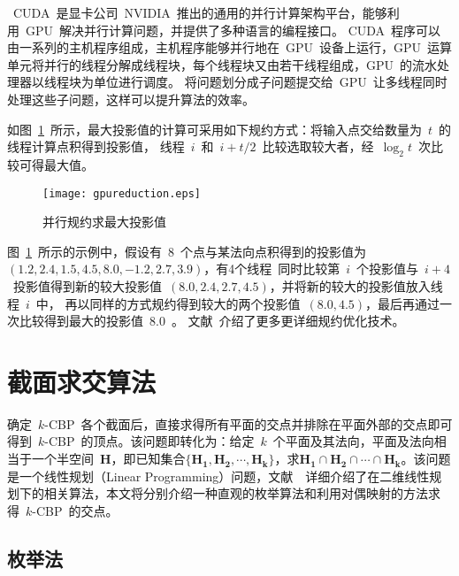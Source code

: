 ~CUDA~是显卡公司~NVIDIA~推出的通用的并行计算架构平台，能够利用~GPU~解决并行计算问题，并提供了多种语言的编程接口。
CUDA~程序可以由一系列的主机程序组成，主机程序能够并行地在~GPU~设备上运行，GPU~运算单元将并行的线程分解成线程块，每个线程块又由若干线程组成，GPU~的流水处理器以线程块为单位进行调度。
将问题划分成子问题提交给~GPU~让多线程同时处理这些子问题，这样可以提升算法的效率\cite{lauterbach2009fast}。

如图~\ref{lbl:reduction-getmax}~所示，最大投影值的计算可采用如下规约方式：将输入点交给数量为~$t$~的线程计算点积得到投影值，
线程~$i$~和~$i+t/2$~比较选取较大者，经~$\log_2t$~次比较可得最大值。

\begin{figure}[htbp] %
\centering
\texttt{[image: gpureduction.eps]}
\caption{并行规约求最大投影值}
\label{lbl:reduction-getmax}
\end{figure}

图~\ref{lbl:reduction-getmax}~所示的示例中，假设有~8~个点与某法向点积得到的投影值为~$(1.2,2.4,1.5,4.5,8.0,-1.2,2.7,3.9)$，有4个线程~同时比较第~$i$~个投影值与~$i+4$~投影值得到新的较大投影值~$(8.0,2.4,2.7,4.5)$，并将新的较大的投影值放入线程~$i$~中，
再以同样的方式规约得到较大的两个投影值~$(8.0,4.5)$，最后再通过一次比较得到最大的投影值~$8.0$~。
文献~介绍了更多更详细规约优化技术。

\section{截面求交算法}
\label{sec:intersect-planes}

确定~$k$-CBP~各个截面后，直接求得所有平面的交点并排除在平面外部的交点即可得到~$k$-CBP~的顶点。该问题即转化为：给定~$k$~个平面及其法向，平面及法向相当于一个半空间~$\bm{H}$，即已知集合$\{\bm{H_1},
\bm{H_2}, \cdots, \bm{H_k}\}$，求$\bm{H_1} \cap \bm{H_2} \cap \cdots
\cap \bm{H_k}$。该问题是一个线性规划（Linear Programming）问题，文献~~详细介绍了在二维线性规划下的相关算法，本文将分别介绍一种直观的枚举算法和利用对偶映射的方法求得~$k$-CBP~的交点。

\subsection{枚举法}
\label{subsec:intersection-enum-geometry}

